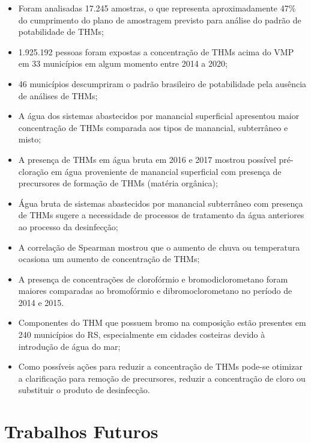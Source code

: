 \begin{itemize}
  \item Foram analisadas 17.245 amostras, o que representa aproximadamente 47\% do cumprimento do plano de amostragem previsto para análise do padrão de potabilidade de THMs;

  \item  1.925.192 pessoas foram expostas a concentração de THMs acima do VMP em 33 municípios em algum momento entre 2014 a 2020;
  
  \item 46 municípios descumpriram o padrão brasileiro de potabilidade pela ausência de análises de THMs;
  
  \item A água dos sistemas abastecidos por manancial superficial apresentou maior concentração de THMs comparada aos tipos de manancial, subterrâneo e misto;
  
  \item A presença de THMs em água bruta em 2016 e 2017 mostrou possível pré-cloração em água proveniente de manancial superficial com presença de precursores de formação de THMs (matéria orgânica);
  
  
  \item Água bruta de sistemas abastecidos por manancial subterrâneo com presença de THMs sugere a necessidade de processos de tratamento da água anteriores ao processo da desinfecção; 
  
  
  \item A correlação de Spearman  mostrou que o aumento de chuva ou temperatura ocasiona um aumento de concentração de THMs;
  
  \item A presença de concentrações de clorofórmio e bromodiclorometano foram maiores comparadas ao bromofórmio e dibromoclorometano no período de 2014 e 2015.
 
  \item Componentes do THM que possuem bromo na composição estão presentes em 240 municípios do RS, especialmente em cidades costeiras devido à introdução de água do mar;

  \item Como possíveis ações para reduzir a concentração de THMs pode-se otimizar a clarificação para remoção de precursores, reduzir a concentração de cloro ou substituir o produto de desinfecção.

\end{itemize}
 
\section{Trabalhos Futuros}


